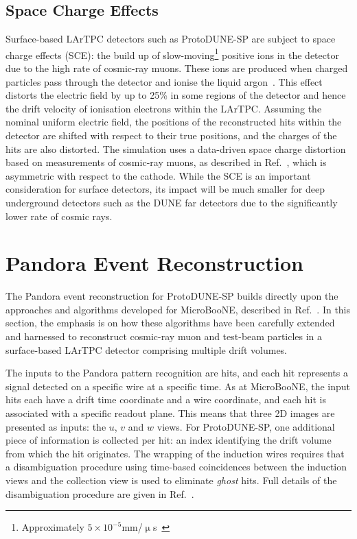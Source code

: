 \documentclass[epjc3]{svjour3}
\begin{document}
\subsection{Space Charge Effects}
Surface-based LArTPC detectors such as ProtoDUNE-SP are subject to space charge effects (SCE): the build up of slow-moving\footnote{Approximately $5\times10^{-5}$mm/$\upmu$s~\cite{ionDrift}} positive ions in the detector due to the high rate of cosmic-ray muons. These ions are produced when charged particles pass through the detector and ionise the liquid argon~\cite{spacecharge}. This effect distorts the electric field by up to 25\% in some regions of the detector and hence the drift velocity of ionisation electrons within the LArTPC. Assuming the nominal uniform electric field, the positions of the reconstructed hits within the detector are shifted with respect to their true positions, and the charges of the hits are also distorted. The simulation uses a data-driven space charge distortion based on measurements of cosmic-ray muons, as described in Ref.~\cite{proto_performance}, which is asymmetric with respect to the cathode. While the SCE is an important consideration for surface detectors, its impact will be much smaller for deep underground detectors such as the DUNE far detectors due to the significantly lower rate of cosmic rays.
 
\section{Pandora Event Reconstruction}
\label{sec:patrec}

The Pandora event reconstruction for ProtoDUNE-SP builds directly upon the approaches and algorithms developed for MicroBooNE, described in Ref.~\cite{pandorauboone}. In this section, the emphasis is on how these algorithms have been carefully extended and harnessed to reconstruct cosmic-ray muon and test-beam particles in a surface-based LArTPC detector comprising multiple drift volumes.

The inputs to the Pandora pattern recognition are hits, and each hit represents a signal detected on a specific wire at a specific time. As at MicroBooNE, the input hits each have a drift time coordinate and a wire coordinate, and each hit is associated with a specific readout plane. This means that three 2D images are presented as inputs: the $u$, $v$ and $w$ views. For ProtoDUNE-SP, one additional piece of information is collected per hit: an index identifying the drift volume from which the hit originates. The wrapping of the induction wires requires that a disambiguation procedure using time-based coincidences between the induction views and the collection view is used to eliminate \textit{ghost} hits. Full details of the disambiguation procedure are given in Ref.~\cite{dunetdr_v2}.
\end{document}
